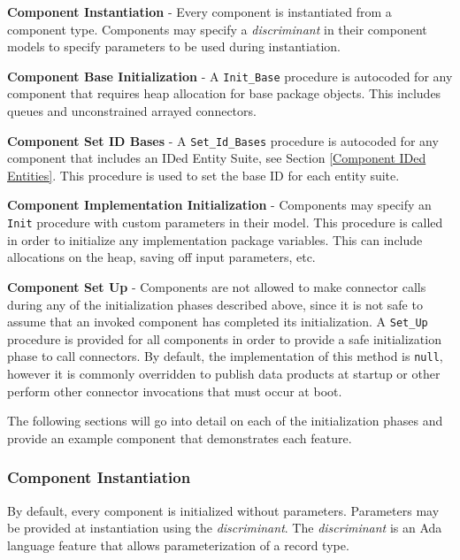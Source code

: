 \vspace{5mm} %
\begin{spacedenumerate}
  \item \textbf{Component Instantiation} - Every component is instantiated from a component type. Components may specify a \textit{discriminant} in their component models to specify parameters to be used during instantiation.
  \item \textbf{Component Base Initialization} - A \texttt{Init\_Base} procedure is autocoded for any component that requires heap allocation for base package objects. This includes queues and unconstrained arrayed connectors.
  \item \textbf{Component Set ID Bases} - A \texttt{Set\_Id\_Bases} procedure is autocoded for any component that includes an IDed Entity Suite, see Section \ref{Component IDed Entities}. This procedure is used to set the base ID for each entity suite.
  \item \textbf{Component Implementation Initialization} - Components may specify an \texttt{Init} procedure with custom parameters in their model. This procedure is called in order to initialize any implementation package variables. This can include allocations on the heap, saving off input parameters, etc.
  \item \textbf{Component Set Up} - Components are not allowed to make connector calls during any of the initialization phases described above, since it is not safe to assume that an invoked component has completed its initialization. A \texttt{Set\_Up} procedure is provided for all components in order to provide a safe initialization phase to call connectors. By default, the implementation of this method is \texttt{null}, however it is commonly overridden to publish data products at startup or other perform other connector invocations that must occur at boot.
\end{spacedenumerate}
\vspace{5mm} %

The following sections will go into detail on each of the initialization phases and provide an example component that demonstrates each feature.

\subsubsection{Component Instantiation} \label{Component Instantiation}

By default, every component is initialized without parameters. Parameters may be provided at instantiation using the \textit{discriminant}. The \textit{discriminant} is an Ada language feature that allows parameterization of a record type. \\

